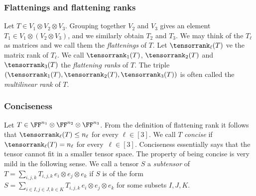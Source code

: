 \subsubsection*{Flattenings and flattening ranks}
Let $T \in V_1 \otimes V_2 \otimes V_3$. Grouping together $V_2$ and $V_3$ gives an element  $T_{1} \in V_1 \otimes (V_2 \otimes V_3)$, and we similarly obtain $T_2$ and $T_3$. %
We may think of the $T_\ell$ as matrices and we call them 
the \emph{flattenings} of $T$.
Let $\tensorrank_{\ell}(T)$ ve the matrix rank of $T_{\ell}$. We call $\tensorrank_1(T)$, $\tensorrank_2(T)$ and $\tensorrank_3(T)$ 
the \emph{flattening ranks} of $T$.
The triple $(\tensorrank_1(T), \tensorrank_2(T), \tensorrank_3(T))$ is often called the \emph{multilinear rank} of $T$. 


\subsubsection*{Conciseness} 
Let $T \in \FF^{n_1} \otimes \FF^{n_2} \otimes \FF^{n_3}$. From the definition of flattening rank it follows that $\tensorrank_\ell(T) \leq n_\ell$ for every $\ell \in [3]$. We call $T$ \emph{concise} if $\tensorrank_\ell(T) = n_\ell$  for every~$\ell \in [3]$. Conciseness essentially says that the tensor cannot fit in a smaller tensor space. The property of being concise is very mild in the following sense. We call a tensor $S$ a \emph{subtensor} of $T = \sum_{i,j,k} T_{i,j,k}\, e_i \otimes e_j \otimes e_k$ if $S$ is of the form $S = \sum_{i\in I,j\in J,k\in K} T_{i,j,k}\, e_i \otimes e_j \otimes e_k$ for some subsets $I,J,K$.

